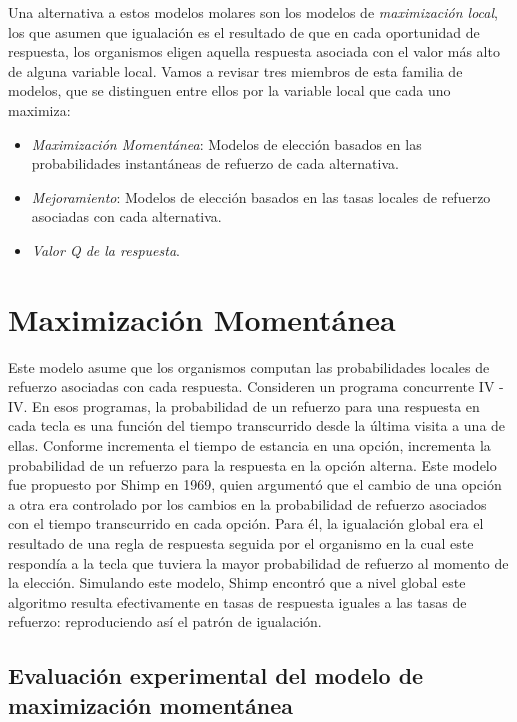 \documentclass[
  a4paper,
  DIV=11,
  numbers=noendperiod]{scrreprt}
\providecommand{\tightlist}{%
  \setlength{\itemsep}{0pt}\setlength{\parskip}{0pt}}\usepackage{longtable,booktabs,array}
\begin{document}
Una alternativa a estos modelos molares son los modelos de
\emph{maximización local}, los que asumen que igualación es el resultado
de que en cada oportunidad de respuesta, los organismos eligen aquella
respuesta asociada con el valor más alto de alguna variable local. Vamos
a revisar tres miembros de esta familia de modelos, que se distinguen
entre ellos por la variable local que cada uno maximiza:

\begin{itemize}
\tightlist
\item
  \emph{Maximización Momentánea}: Modelos de elección basados en las
  probabilidades instantáneas de refuerzo de cada alternativa.
\item
  \emph{Mejoramiento}: Modelos de elección basados en las tasas locales
  de refuerzo asociadas con cada alternativa.
\item
  \emph{Valor Q de la respuesta}.
\end{itemize}

\section{Maximización Momentánea}\label{maximizaciuxf3n-momentuxe1nea}

Este modelo asume que los organismos computan las probabilidades locales
de refuerzo asociadas con cada respuesta. Consideren un programa
concurrente IV - IV. En esos programas, la probabilidad de un refuerzo
para una respuesta en cada tecla es una función del tiempo transcurrido
desde la última visita a una de ellas. Conforme incrementa el tiempo de
estancia en una opción, incrementa la probabilidad de un refuerzo para
la respuesta en la opción alterna. Este modelo fue propuesto por Shimp
en 1969, quien argumentó que el cambio de una opción a otra era
controlado por los cambios en la probabilidad de refuerzo asociados con
el tiempo transcurrido en cada opción. Para él, la igualación global era
el resultado de una regla de respuesta seguida por el organismo en la
cual este respondía a la tecla que tuviera la mayor probabilidad de
refuerzo al momento de la elección. Simulando este modelo, Shimp
encontró que a nivel global este algoritmo resulta efectivamente en
tasas de respuesta iguales a las tasas de refuerzo: reproduciendo así el
patrón de igualación.

\subsection{Evaluación experimental del modelo de maximización
momentánea}\label{evaluaciuxf3n-experimental-del-modelo-de-maximizaciuxf3n-momentuxe1nea}
\end{document}

